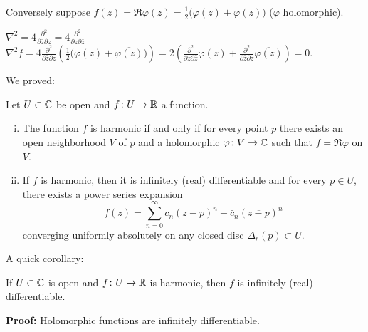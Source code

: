 \documentclass[10pt,aspectratio=169]{beamer}
\begin{document}
\begin{frame}
Conversely suppose
\qquad
$
f(z) = \Re \varphi(z) =
\tfrac{1}{2}\bigl( \varphi(z) + \overline{\varphi(z)} \bigr)$
\qquad ($\varphi$ holomorphic).

\medskip
\pause

$\displaystyle
\nabla^2 =
4 \frac{\partial^2}{\partial \bar{z} \partial z}
=
4 \frac{\partial^2}{\partial z \partial \bar{z}}
$
\pause
\wthus
$\displaystyle
\nabla^2 f =
4 \frac{\partial^2}{\partial \bar{z} \partial z}
\left(
\frac{1}{2}\bigl( \varphi(z) + \overline{\varphi(z)} \bigr)
\right)
=
2
\left(
\frac{\partial^2}{\partial z \partial \bar{z}}
\varphi(z) +
\frac{\partial^2}{\partial \bar{z} \partial z}
\overline{\varphi(z)}
\right)
=
0$.

\medskip

\pause
We proved:
\begin{proposition}
Let $U \subset {\mathbb{C}}$ be open and $f \colon U \to {\mathbb{R}}$ a function.
\begin{enumerate}[(i)]
\item
The function $f$ is harmonic if and only if
for every point $p$ there exists an open neighborhood $V$ of $p$ and a
holomorphic $\varphi \colon V \to {\mathbb{C}}$ such that $f = \Re \varphi$
on $V$.
\pause
\item
If $f$ is harmonic, then it is infinitely (real) differentiable and
for every $p \in U$, there exists a power series expansion
\begin{equation*}
f(z) =
\sum_{n=0}^\infty c_n {(z-p)}^n + \bar{c}_n {(\overline{z-p})}^n
\end{equation*}
converging uniformly absolutely
on any closed disc $\overline{\Delta_r(p)} \subset U$.
\end{enumerate}
\end{proposition}
\end{frame}

\begin{frame}
A quick corollary:

\begin{proposition}
If $U \subset {\mathbb{C}}$ is open and $f \colon U \to {\mathbb{R}}$ is harmonic,
then $f$ is infinitely (real) differentiable.
\end{proposition}

\textbf{Proof:} Holomorphic functions are infinitely differentiable.

\end{frame}
\end{document}
